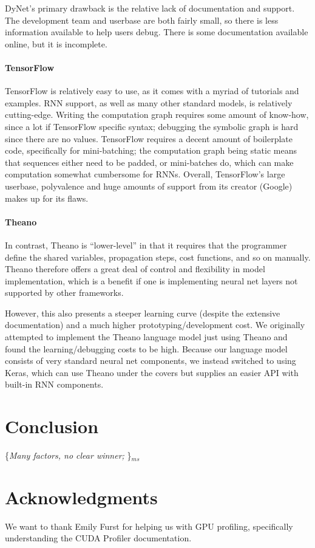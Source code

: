 \documentclass{article}
\newcommand{\ms}[1]{{\color{cyan}\{\textit{#1}\}$_{ms}$}}
\begin{document}
DyNet's primary drawback is the relative lack of documentation and support. The development team and userbase are both fairly small, so there is less information available to help users debug. There is some documentation available online, but it is incomplete.

\paragraph{TensorFlow} TensorFlow is relatively easy to use, as it comes with a myriad of tutorials and examples. RNN support, as well as many other standard models, is relatively cutting-edge. Writing the computation graph requires some amount of know-how, since a lot if TensorFlow specific syntax; debugging the symbolic graph is hard since there are no values.
TensorFlow requires a decent amount of boilerplate code, specifically for mini-batching; the computation graph being static means that sequences either need to be padded, or mini-batches do, which can make computation somewhat cumbersome for RNNs. Overall, TensorFlow's large userbase, polyvalence and huge amounts of support from its creator (Google) makes up for its flaws.

\paragraph{Theano} 
In contrast, Theano is ``lower-level'' in that it requires that the programmer define the shared variables, propagation steps, cost functions, and so on manually. Theano therefore offers a great deal of control and flexibility in model implementation, which is a benefit if one is implementing neural net layers not supported by other frameworks.

However, this also presents a steeper learning curve (despite the extensive documentation) and a much higher prototyping/development cost. We originally attempted to implement the Theano language model just using Theano and found the learning/debugging costs to be high. Because our language model consists of very standard neural net components, we instead switched to using Keras, which can use Theano under the covers but supplies an easier API with built-in RNN components.



\section{Conclusion}
\ms{Many factors, no clear winner; }

\section*{Acknowledgments}
We want to thank Emily Furst for helping us with GPU profiling, specifically understanding the CUDA Profiler documentation.
\newpage


\end{document}
